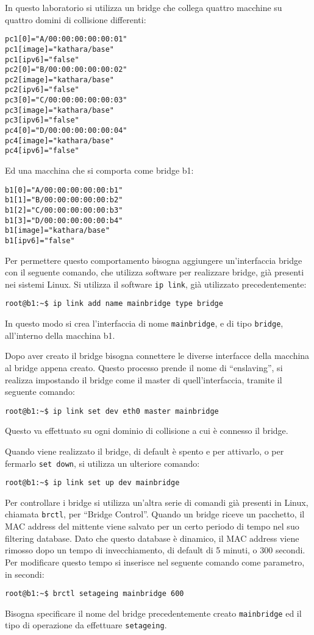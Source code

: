\documentclass{article}
\numberwithin{equation}{subsection}
\begin{document}
In questo laboratorio si utilizza un bridge che collega quattro macchine su quattro domini di collisione differenti: 
\begin{verbatim}
pc1[0]="A/00:00:00:00:00:01"
pc1[image]="kathara/base"
pc1[ipv6]="false"
pc2[0]="B/00:00:00:00:00:02"
pc2[image]="kathara/base"
pc2[ipv6]="false"
pc3[0]="C/00:00:00:00:00:03"
pc3[image]="kathara/base"
pc3[ipv6]="false"
pc4[0]="D/00:00:00:00:00:04"
pc4[image]="kathara/base"
pc4[ipv6]="false"
\end{verbatim}
Ed una macchina che si comporta come bridge b1:
\begin{verbatim}
b1[0]="A/00:00:00:00:00:b1"
b1[1]="B/00:00:00:00:00:b2"
b1[2]="C/00:00:00:00:00:b3"
b1[3]="D/00:00:00:00:00:b4"
b1[image]="kathara/base"
b1[ipv6]="false"
\end{verbatim}
Per permettere questo comportamento bisogna aggiungere un'interfaccia bridge con il seguente comando, che utilizza software per realizzare bridge, già presenti nei 
sistemi Linux. Si utilizza il software \verb|ip link|, già utilizzato precedentemente:
\begin{verbatim}
root@b1:~$ ip link add name mainbridge type bridge
\end{verbatim}
In questo modo si crea l'interfaccia di nome \verb|mainbridge|, e di tipo \verb|bridge|, all'interno della macchina b1.  

Dopo aver creato il bridge bisogna connettere le diverse interfacce della macchina al bridge appena creato. Questo processo prende il nome di ``enslaving'', si realizza 
impostando il bridge come il master di quell'interfaccia, tramite il seguente comando:
\begin{verbatim}
root@b1:~$ ip link set dev eth0 master mainbridge
\end{verbatim}
Questo va effettuato su ogni dominio di collisione a cui è connesso il bridge. 

Quando viene realizzato il bridge, di default è spento e per attivarlo, o per fermarlo \verb|set down|, si utilizza un ulteriore comando:
\begin{verbatim}
root@b1:~$ ip link set up dev mainbridge
\end{verbatim}
Per controllare i bridge si utilizza un'altra serie di comandi già presenti in Linux, chiamata \verb|brctl|, per ``Bridge Control''. Quando un bridge riceve un pacchetto, 
il MAC address del mittente viene salvato per un certo periodo di tempo nel suo filtering database. Dato che questo database è dinamico, il MAC address viene 
rimosso dopo un tempo di invecchiamento, di default di 5 minuti, o 300 secondi. Per modificare questo tempo si inserisce nel seguente comando come parametro, in secondi:
\begin{verbatim}
root@b1:~$ brctl setageing mainbridge 600  
\end{verbatim}
Bisogna specificare il nome del bridge precedentemente creato \verb|mainbridge| ed il tipo di operazione da effettuare \verb|setageing|. 
\end{document}
